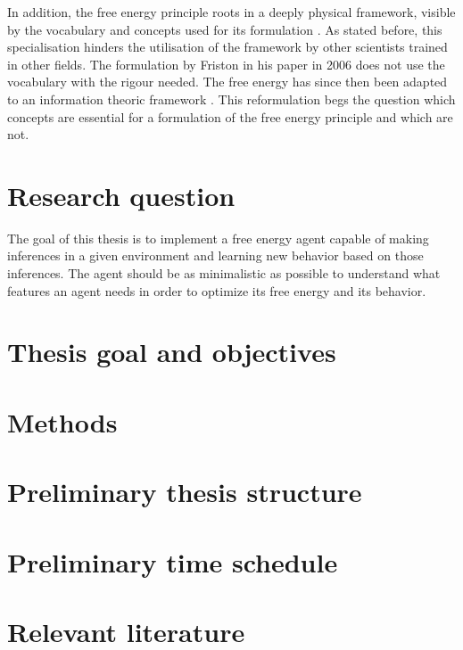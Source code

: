 \documentclass[11pt,
  paper=a4,
  bibliography=totocnumbered,
	captions=tableheading,
	BCOR=10mm
]{scrreprt}
\theoremstyle{definition}
\begin{document}
In addition, the free energy principle roots in a deeply physical framework, visible by the vocabulary and concepts used for its formulation \cite{}. As stated before, this specialisation hinders the utilisation of the framework by other scientists trained in other fields. The formulation by Friston in his paper in 2006 does not use the vocabulary with the rigour needed. The free energy has since then been adapted to an information theoric framework \cite{Friston2016}. This reformulation begs the question which concepts are essential for a formulation of the free energy principle and which are not.

\section{Research question}

The goal of this thesis is to implement a free energy agent capable of making inferences in a given environment and learning new behavior based on those inferences. The agent should be as minimalistic as possible to understand what features an agent needs in order to optimize its free energy and its behavior.







\section{Thesis goal and objectives}
\section{Methods}
\section{Preliminary thesis structure}
\section{Preliminary time schedule}
\section{Relevant literature}


\glsaddall
\printglossaries

\printbibliography
\end{document}
